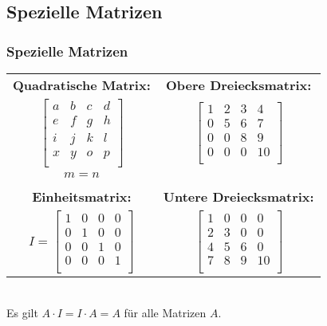 \documentclass{beamer}
\begin{document}
\subsection{Spezielle Matrizen}
\begin{frame}
  \frametitle{Spezielle Matrizen}
  \begin{tabular}{cc}
    \textbf{Quadratische Matrix:} & \textbf{Obere Dreiecksmatrix:}\\ 
    $\begin{bmatrix}
      a & b & c & d \\
      e & f & g & h \\
      i & j & k & l \\
      x & y & o & p \\
    \end{bmatrix}
      $ & $ \begin{bmatrix}
        1 & 2 & 3 & 4 \\
        0 & 5 & 6 & 7 \\
        0 & 0 & 8 & 9 \\
        0 & 0 & 0 & 10 \\       
      \end{bmatrix}$\\
      $m=n$ &\\
      \\
      \textbf{Einheitsmatrix:} & \textbf{Untere Dreiecksmatrix:} \\
     $I = \begin{bmatrix}
      1 & 0 & 0 & 0 \\
      0 & 1 & 0 & 0 \\
      0 & 0 & 1 & 0 \\
      0 & 0 & 0 & 1 \\
    \end{bmatrix}$ 
    &
    $  \begin{bmatrix}
      1 & 0 & 0 & 0 \\
      2 & 3 & 0 & 0 \\
      4 & 5 & 6 & 0 \\
      7 & 8 & 9 & 10 \\       
    \end{bmatrix}$\\   
  \end{tabular}\\
  \vspace{0.3cm}
  Es gilt $A\cdot I = I \cdot A = A$ für alle Matrizen $A$.
  
\end{frame}
\end{document}
